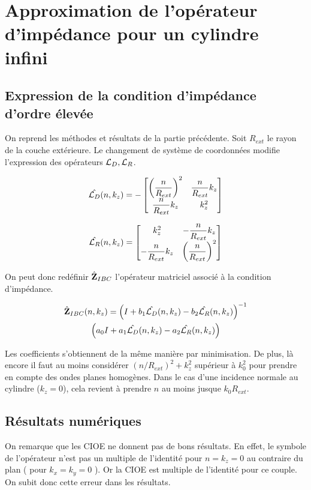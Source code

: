 \section{Approximation de l'opérateur d'impédance pour un cylindre infini}

  \subsection{Expression de la condition d'impédance d'ordre élevée}

    On reprend les méthodes et résultats de la partie précédente.
    Soit \(R_{ext}\) le rayon de la couche extérieure.
    Le changement de système de coordonnées modifie l'expression des opérateurs \({\mathcal{L}_D}, {\mathcal{L}_R}\).

    \begin{equation}
      \hat{{\mathcal{L}_D}}(n,k_z) = -
      \begin{bmatrix}
        \left(\dfrac{n}{R_{ext}}\right)^2 & \dfrac{n}{R_{ext}} k_z
        \\
        \dfrac{n}{R_{ext}} k_z & k_z^2
      \end{bmatrix}
    \end{equation}

    \begin{equation}
      \hat{{\mathcal{L}_R}}(n,k_z) =
      \begin{bmatrix}
        k_z^2 & -\dfrac{n}{R_{ext}} k_z
        \\
        -\dfrac{n}{R_{ext}} k_z & \left(\dfrac{n}{R_{ext}}\right)^2
      \end{bmatrix}
    \end{equation}

    On peut donc redéfinir \(\hat{\mathbf{Z}}_{IBC}\) l’opérateur matriciel associé à la condition d'impédance. 

    \begin{multline}
        \hat{\mathbf{Z}}_{IBC}(n,k_z) = \left(I + b_1 \hat{{\mathcal{L}_D}}(n,k_z) - b_2 \hat{{\mathcal{L}_R}}(n,k_z) \right)^{-1}\\
        \left(a_0 I + a_1 \hat{{\mathcal{L}_D}}(n,k_z) - a_2 \hat{{\mathcal{L}_R}}(n,k_z)\right)
    \end{multline}

    Les coefficients s'obtiennent de la même manière par minimisation. 
    De plus, là encore il faut au moins considérer \((n\slash R_{ext})^2 + k_z^2\) supérieur à \(k_0^2\) pour prendre en compte des ondes planes homogènes. Dans le cas d'une incidence normale au cylindre (\(k_z = 0 \)), cela revient à prendre \(n\) au moins jusque \(k_0 R_{ext}\).

  \subsection{Résultats numériques}

    On remarque que les CIOE ne donnent pas de bons résultats. En effet, le symbole de l'opérateur n'est pas un multiple de l'identité pour \(n=k_z=0\) au contraire du plan ( pour \(k_x=k_y=0\) ). Or la CIOE est multiple de l'identité pour ce couple. On subit donc cette erreur dans les résultats.